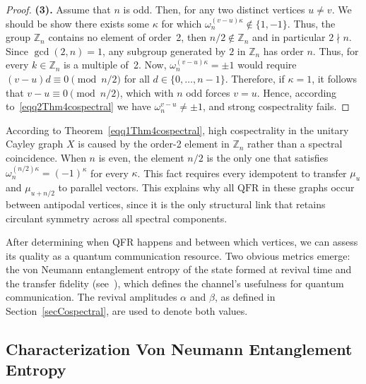 \documentclass[12pt]{amsart}
\newcommand{\QFR}{\mathrm{QFR}}
\begin{document}
\begin{proof}
  
\medskip

\noindent \textbf{(3).} Assume that $n$ is odd. Then, for  any two distinct vertices
  $u \neq v$. We should be show there exists some $\kappa$ for which $\omega_n^{(v-u)\kappa} \notin
  \{1,-1\}$. Thus, the group $\mathbb{Z}_n$ contains no element of order~2, then
  $n/2 \notin \mathbb{Z}_n$ and in particular $2 \nmid n$. 
  Since $\gcd(2,n) = 1$, any  subgroup generated
  by $2$ in $\mathbb{Z}_n$ has order $n$. Thus,  for every $k\in \mathbb{Z}_n$ is a multiple of~2. Now, $\omega_n^{(v-u)\kappa} = \pm 1$ would require
  $(v-u)d \equiv 0 \pmod{n/2}$ for all $d \in \{0,\ldots,n-1\}$. 
  Therefore, if $\kappa=1$, it follows that  $v - u \equiv 0 \pmod{n/2}$, which with $n$ odd forces $v = u$.  Hence, according to~\eqref{eqq2Thm4cospectral} we have $\omega_n^{v-u} \neq \pm 1$, and strong
  cospectrality fails.



\end{proof}

According to Theorem~\ref{eqq1Thm4cospectral}, high cospectrality in the unitary Cayley graph $X$ is caused by the order-2 element in $\mathbb{Z}_n$ rather than a spectral coincidence. When $n$ is even, the element $n/2$ is the only one that satisfies $\omega_n^{(n/2)\kappa} = (-1)^\kappa$ for every $\kappa$. This fact requires every idempotent to transfer $\mu_u$ and $\mu_{u+n/2}$ to parallel vectors. This explains why all $\QFR$ in these graphs occur between antipodal vertices, since it is the only structural link that retains circulant symmetry across all spectral components.



After determining when QFR happens and between which vertices, we can assess its quality as a quantum communication resource. Two obvious metrics emerge: the von Neumann entanglement entropy of the state formed at revival time and the transfer fidelity (see~\cite{godsil2012}), which defines the channel's usefulness for quantum communication. The revival amplitudes $\alpha$ and $\beta$, as defined in Section~\ref{secCospectral}, are used to denote both values.

\subsection{Characterization Von Neumann Entanglement Entropy}
\end{document}
